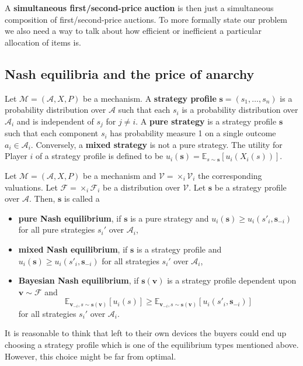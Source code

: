 A \textbf{simultaneous first/second-price auction} is then just a simultaneous composition of first/second-price auctions.
To more formally state our problem we also need a way to talk about how efficient or inefficient a particular allocation of items is.


\subsection{Nash equilibria and the price of anarchy} %
\label{sub:Nash equilibria and the price of anarchy}
\begin{definition}[Strategy]
  Let $ \mathcal{M} = (\mathcal{A}, X, P) $ be a mechanism. A \textbf{strategy profile} $ \mathbf{s} = (s_1, \ldots, s_n) $ is a probability distribution over $ \mathcal{A} $ such that each $ s_i $ is a probability distribution over $ \mathcal{A}_i $ and is independent of $ s_j $ for $ j \neq i $. A \textbf{pure strategy} is a strategy profile $ \mathbf{s} $ such that each component $ s_i $ has probability measure 1 on a single outcome $ a_i \in \mathcal{A}_i $. Conversely, a \textbf{mixed strategy} is not a pure strategy. The utility for Player $ i $ of a strategy profile is defined to be $ u_i(\mathbf{s}) = \mathbb{E}_{s \sim \mathbf{s}}[u_i(X_i(s))] $.
\end{definition}
\begin{definition}
  Let $ \mathcal{M} = (\mathcal{A}, X, P)$ be a mechanism and $ \mathcal{V} = \times_i \mathcal{V}_i $ the corresponding valuations. Let $ \mathcal{F} = \times_i \mathcal{F}_i $ be a distribution over $ \mathcal{V} $. Let $ \mathbf{s} $ be a strategy profile over $ \mathcal{A} $. Then, $ \mathbf{s} $ is called a
  \begin{itemize}
    \item \textbf{pure Nash equilibrium}, if $ \mathbf{s} $ is a pure strategy and $ u_i(\mathbf{s}) \geq u_i(s'_i, \mathbf{s}_{-i}) $ for all pure strategies $ s_i' $ over $ \mathcal{A}_i $,
    \item \textbf{mixed Nash equilibrium}, if $ \mathbf{s} $ is a strategy profile and $ u_i(\mathbf{s}) \geq u_i(s'_i, \mathbf{s}_{-i}) $ for all strategies $ s_i' $ over $ \mathcal{A}_i $,
    \item \textbf{Bayesian Nash equilibrium}, if $ \mathbf{s}(\mathbf{v}) $ is a strategy profile dependent upon $ \mathbf{v} \sim \mathcal{F} $ and \begin{equation*}
        \mathbb{E}_{\mathbf{v}_{-i}, s\sim \mathbf{s}(\mathbf{v})}[u_i(s)] \geq \mathbb{E}_{\mathbf{v}_{-i}, s \sim \mathbf{s}(\mathbf{v})}[u_i(s'_i, \mathbf{s}_{-i})]
    \end{equation*}
    for all strategies $ s_i' $ over $ \mathcal{A}_i $.
  \end{itemize}
\end{definition}
It is reasonable to think that left to their own devices the buyers could end up choosing a strategy profile which is one of the equilibrium types mentioned above. However, this choice might be far from optimal.

